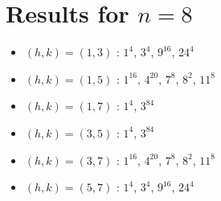 \section{Results for $n=8$}
\begin{itemize}
\item $(h,k)=(1,3)$ : $1^{4}$, $3^{4}$, $9^{16}$, $24^{4}$
\item $(h,k)=(1,5)$ : $1^{16}$, $4^{20}$, $7^{8}$, $8^{2}$, $11^{8}$
\item $(h,k)=(1,7)$ : $1^{4}$, $3^{84}$
\item $(h,k)=(3,5)$ : $1^{4}$, $3^{84}$
\item $(h,k)=(3,7)$ : $1^{16}$, $4^{20}$, $7^{8}$, $8^{2}$, $11^{8}$
\item $(h,k)=(5,7)$ : $1^{4}$, $3^{4}$, $9^{16}$, $24^{4}$
\end{itemize}
